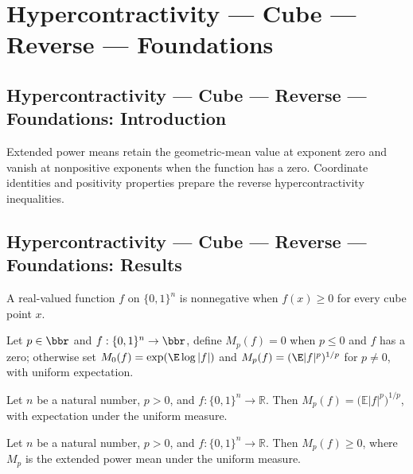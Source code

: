 \section{Hypercontractivity --- Cube --- Reverse --- Foundations}
\subsection*{Hypercontractivity --- Cube --- Reverse --- Foundations: Introduction}
Extended power means retain the geometric-mean value at exponent zero and vanish at nonpositive exponents when the function has a zero. Coordinate identities and positivity properties prepare the reverse hypercontractivity inequalities.

\subsection*{Hypercontractivity --- Cube --- Reverse --- Foundations: Results}

\begin{definition}
\leanok
{}
A real-valued function $f$ on $\{0,1\}^n$ is nonnegative when $f(x)\ge0$ for every cube point $x$.
\end{definition}

\begin{definition}
\leanok
{}
Let $p\in\bbr$ and $f:\{0,1\}^n\to\bbr$, define $M_p(f)=0$ when $p\le0$ and $f$ has a zero; otherwise set $M_0(f)=\exp(\E\log|f|)$ and $M_p(f)=(\E|f|^p)^{1/p}$ for $p\ne0$, with uniform expectation.
\end{definition}

\begin{lemma}
\leanok
{}
Let $n$ be a natural number, $p>0$, and $f:\{0,1\}^n\to\mathbb{R}$. Then
$M_p(f)=\bigl(\mathbb{E}|f|^p\bigr)^{1/p}$, with expectation under the uniform measure.
\end{lemma}

\begin{lemma}
\leanok
{}
Let $n$ be a natural number, $p>0$, and $f:\{0,1\}^n\to\mathbb{R}$. Then $M_p(f)\ge0$,
where $M_p$ is the extended power mean under the uniform measure.
\end{lemma}

